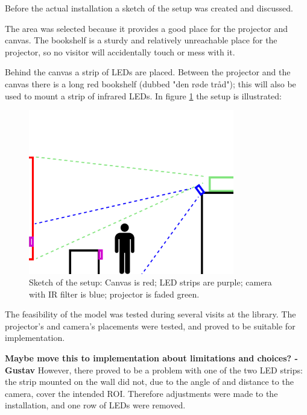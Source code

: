 
Before the actual installation a sketch of the setup was created and discussed.

The area was selected because it provides a good place for the projector and canvas. The bookshelf is a sturdy and relatively unreachable place for the projector, so no visitor will accidentally touch or mess with it.

Behind the canvas a strip of LEDs are placed. Between the projector and the canvas there is a long red bookshelf (dubbed "den r{\o}de tr{\aa}d"); this will also be used to mount a strip of infrared LEDs. In figure \ref{fig:setup_model} the setup is illustrated:

\begin{figure}[htbp] 
\centering 
\includegraphics[width=0.8\textwidth]{Pictures/Setup/sideview_camera_with_person_two_strips.png} 
\caption{Sketch of the setup: Canvas is red; LED strips are purple; camera with IR filter is blue; projector is faded green.} 
\label{fig:setup_model} 
\end{figure}

The feasibility of the model was tested during several visits at the library. The projector's and camera's placements were tested, and proved to be suitable for implementation.

\textbf{Maybe move this to implementation about limitations and choices? - Gustav}
However, there proved to be a problem with one of the two LED strips: the strip mounted on the wall did not, due to the angle of and distance to the camera, cover the intended ROI. Therefore adjustments were made to the installation, and one row of LEDs were removed.

